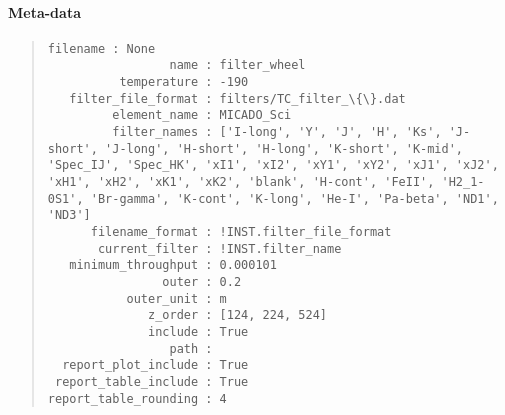 \paragraph{Meta-data%
  \label{id2}%
}

\begin{quote}
\begin{alltt}
\begin{lstlisting}[frame=single]
             filename : None
                 name : filter_wheel
          temperature : -190
   filter_file_format : filters/TC_filter_\{\}.dat
         element_name : MICADO_Sci
         filter_names : ['I-long', 'Y', 'J', 'H', 'Ks', 'J-short', 'J-long', 'H-short', 'H-long', 'K-short', 'K-mid', 'Spec_IJ', 'Spec_HK', 'xI1', 'xI2', 'xY1', 'xY2', 'xJ1', 'xJ2', 'xH1', 'xH2', 'xK1', 'xK2', 'blank', 'H-cont', 'FeII', 'H2_1-0S1', 'Br-gamma', 'K-cont', 'K-long', 'He-I', 'Pa-beta', 'ND1', 'ND3']
      filename_format : !INST.filter_file_format
       current_filter : !INST.filter_name
   minimum_throughput : 0.000101
                outer : 0.2
           outer_unit : m
              z_order : [124, 224, 524]
              include : True
                 path :
  report_plot_include : True
 report_table_include : True
report_table_rounding : 4
\end{lstlisting}
\end{alltt}
\end{quote}
